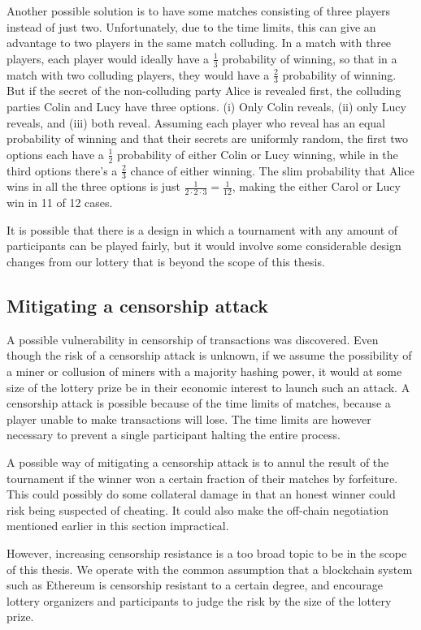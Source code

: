 Another possible solution is to have some matches consisting of three players instead of just two. Unfortunately, due to the time limits, this can give an advantage to two players in the same match colluding. In a match with three players, each player would ideally have a $\frac{1}{3}$ probability of winning, so that in a match with two colluding players, they would have a $\frac{2}{3}$ probability of winning. But if the secret of the non-colluding party Alice is revealed first, the colluding parties Colin and Lucy have three options. (i) Only Colin reveals, (ii) only Lucy reveals, and (iii) both reveal. Assuming each player who reveal has an equal probability of winning and that their secrets are uniformly random, the first two options each have a $\frac{1}{2}$ probability of either Colin or Lucy winning, while in the third options there's a $\frac{2}{3}$ chance of either winning. The slim probability that Alice wins in all the three options is just $\frac{1}{2 \cdot 2 \cdot 3}=\frac{1}{12}$, making the either Carol or Lucy win in 11 of 12 cases.

It is possible that there is a design in which a tournament with any amount of participants can be played fairly, but it would involve some considerable design changes from our lottery that is beyond the scope of this thesis.

\subsection{Mitigating a censorship attack}

A possible vulnerability in censorship of transactions was discovered. Even though the risk of a censorship attack is unknown, if we assume the possibility of a miner or collusion of miners with a majority hashing power, it would at some size of the lottery prize be in their economic interest to launch such an attack. A censorship attack is possible because of the time limits of matches, because a player unable to make transactions will lose. The time limits are however necessary to prevent a single participant halting the entire process. 

A possible way of mitigating a censorship attack is to annul the result of the tournament if the winner won a certain fraction of their matches by forfeiture. This could possibly do some collateral damage in that an honest winner could risk being suspected of cheating. It could also make the off-chain negotiation mentioned earlier in this section impractical. 

However, increasing censorship resistance is a too broad topic to be in the scope of this thesis. We operate with the common assumption that a blockchain system such as Ethereum is censorship resistant to a certain degree, and encourage lottery organizers and participants to judge the risk by the size of the lottery prize.
